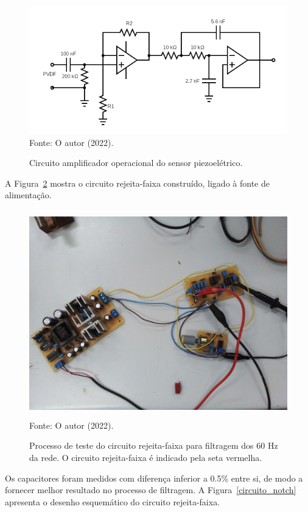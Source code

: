 \documentclass[
	12pt,				
	oneside,			
	a4paper,			
	english,			
	brazil,			
	]{abntex2ppgsi}
\begin{document}
\begin{figure}[H]
\centering
\caption {Circuito amplificador operacional do sensor piezoelétrico.}
\includegraphics[width=\textwidth,height=\textheight,keepaspectratio]{circuito_novo_certo} \\
Fonte: O autor (2022).
\label{circuito_novo_certo}
\end{figure} 

A Figura~\ref{circuito_rejeita_faixa} mostra o circuito rejeita-faixa construído, ligado à fonte de alimentação. 

\begin{figure}[H]
\centering
\caption {Processo de teste do circuito rejeita-faixa para filtragem dos 60 Hz da rede. O circuito rejeita-faixa é indicado pela seta vermelha.}
\includegraphics[width=\textwidth,height=90mm,keepaspectratio]{circuito_rejeita_faixa} \\
Fonte: O autor (2022).
\label{circuito_rejeita_faixa}
\end{figure} 

Os capacitores foram medidos com diferença inferior a 0.5\% entre si, de modo a fornecer melhor resultado no processo de filtragem. A Figura~\ref{circuito_notch} apresenta o desenho esquemático do circuito rejeita-faixa.
\end{document}
